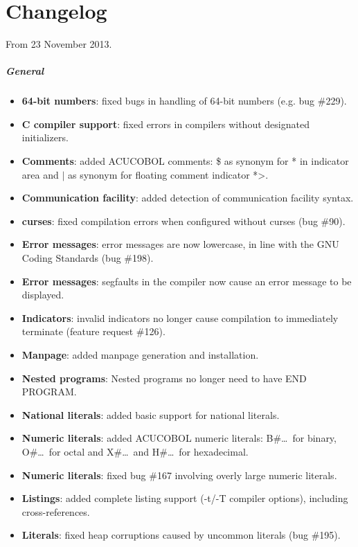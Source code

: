 \chapter{Changelog}

From 23 November 2013.

\paragraph{General}
\begin{itemize}
\item \textbf{64-bit numbers}: fixed bugs in handling of 64-bit numbers (e.g. bug \#229).
\item \textbf{C compiler support}: fixed errors in compilers without designated initializers.
\item \textbf{Comments}: added ACUCOBOL comments: \$ as synonym for * in indicator area and $\vert$ as synonym for floating comment indicator *>.
\item \textbf{Communication facility}: added detection of communication facility syntax.
\item \textbf{curses}: fixed compilation errors when configured without curses (bug \#90).
\item \textbf{Error messages}: error messages are now lowercase, in line with the GNU Coding Standards (bug \#198).
\item \textbf{Error messages}: segfaults in the compiler now cause an error message to be displayed.
\item \textbf{Indicators}: invalid indicators no longer cause compilation to immediately terminate (feature request \#126).
\item \textbf{Manpage}: added manpage generation and installation.
\item \textbf{Nested programs}: Nested programs no longer need to have END PROGRAM.
\item \textbf{National literals}: added basic support for national literals.
\item \textbf{Numeric literals}: added ACUCOBOL numeric literals: B\#\ldots\, for binary, O\#\ldots\, for octal and X\#\ldots\, and H\#\ldots\, for hexadecimal.
\item \textbf{Numeric literals}: fixed bug \#167 involving overly large numeric literals.
\item \textbf{Listings}: added complete listing support (-t\slash{}-T compiler options), including cross-references.
\item \textbf{Literals}: fixed heap corruptions caused by uncommon literals (bug \#195).

\end{itemize}
